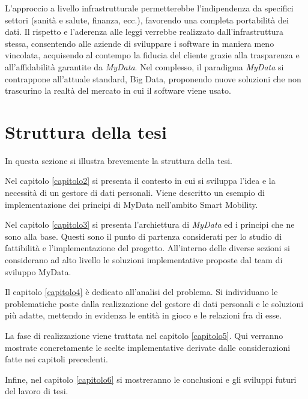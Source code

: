 L’approccio a livello infrastrutturale permetterebbe l’indipendenza da specifici settori (sanit\`a e salute, finanza, ecc.), favorendo una completa portabilit\`a dei dati. Il rispetto e l’aderenza alle leggi verrebbe realizzato dall’infrastruttura stessa, consentendo alle aziende di sviluppare i software in maniera meno vincolata, acquisendo al contempo la fiducia del cliente grazie alla trasparenza e all’affidabilit\`a garantite da \textit{MyData}.
Nel complesso, il paradigma \textit{MyData} si contrappone all’attuale standard, Big Data, proponendo nuove soluzioni che non trascurino la realt\`a del mercato in cui il software viene usato.

\section{Struttura della tesi}

In questa sezione si illustra brevemente la struttura della tesi.

Nel capitolo \ref{capitolo2} si presenta il contesto in cui si sviluppa l'idea e la necessit\`a di un gestore di dati personali. Viene descritto un esempio di implementazione dei principi di MyData nell'ambito Smart Mobility.

Nel capitolo \ref{capitolo3} si presenta l'archiettura di \textit{MyData} ed i principi che ne sono alla base. Questi sono il punto di partenza considerati per lo studio di fattibilit\`a e l'implementazione del progetto. All'interno delle diverse sezioni si considerano ad alto livello le soluzioni implementative proposte dal team di sviluppo MyData.

Il capitolo \ref{capitolo4} \`e dedicato all'analisi del problema. Si individuano le problematiche poste dalla realizzazione del gestore di dati personali e le soluzioni pi\`u adatte, mettendo in evidenza le entit\`a in gioco e le relazioni fra di esse.

La fase di realizzazione viene trattata nel capitolo \ref{capitolo5}. Qui verranno mostrate concretamente le scelte implementative derivate dalle considerazioni fatte nei capitoli precedenti.

Infine, nel capitolo \ref{capitolo6} si mostreranno le conclusioni e gli sviluppi futuri del lavoro di tesi.

